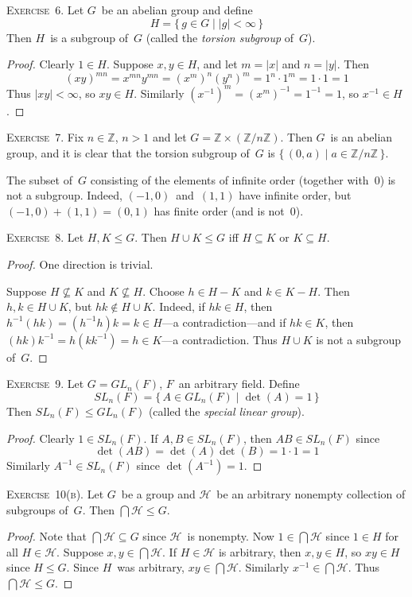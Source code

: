 \documentclass[letterpaper]{article}
\newcommand{\exercise}[1]{\goodbreak\noindent\textsc{Exercise~{#1}.}}
\newcommand{\Z}{\mathbb{Z}}
\renewcommand{\H}{\mathcal{H}}
\newcommand{\union}{\cup}
\newcommand{\bigsect}{\bigcap}
\newcommand{\subgroup}{\le}
\newcommand{\ord}[1]{|{#1}|}
\begin{document}
\exercise{6} Let $G$~be an abelian group and define
$$H=\{\,g\in G\mid\ord{g}<\infty\,\}$$
Then $H$~is a subgroup of~$G$ (called the \emph{torsion subgroup} of~$G$).
\begin{proof}
Clearly $1\in H$. Suppose $x,y\in H$, and let $m=\ord{x}$ and $n=\ord{y}$. Then
$$(xy)^{mn}=x^{mn}y^{mn}=(x^m)^n(y^n)^m=1^n\cdot1^m=1\cdot1=1$$
Thus $\ord{xy}<\infty$, so $xy\in H$. Similarly $(x^{-1})^m=(x^m)^{-1}=1^{-1}=1$, so $x^{-1}\in H$.
\end{proof}

\exercise{7} Fix $n\in\Z$, $n>1$ and let $G=\Z\times(\Z/n\Z)$. Then $G$~is an abelian group, and it is clear that the torsion subgroup of~$G$ is $\{\,(0,a)\mid a\in\Z/n\Z\,\}$.

The subset of~$G$ consisting of the elements of infinite order (together with~$0$) is not a subgroup. Indeed, $(-1,0)$~and~$(1,1)$ have infinite order, but $(-1,0)+(1,1)=(0,1)$ has finite order (and is not~$0$).

\bigskip
\exercise{8}
Let $H,K\subgroup G$. Then $H\union K\subgroup G$ iff $H\subseteq K$ or $K\subseteq H$.
\begin{proof}
One direction is trivial.

Suppose $H\not\subseteq K$ and $K\not\subseteq H$. Choose $h\in H-K$ and $k\in K-H$. Then $h,k\in H\union K$, but $hk\not\in H\union K$. Indeed, if $hk\in H$, then $h^{-1}(hk)=(h^{-1}h)k=k\in H$---a contradiction---and if $hk\in K$, then $(hk)k^{-1}=h(kk^{-1})=h\in K$---a contradiction. Thus $H\union K$ is not a subgroup of~$G$.
\end{proof}

\exercise{9}
Let $G=GL_n(F)$, $F$~an arbitrary field. Define
$$SL_n(F)=\{\,A\in GL_n(F)\mid \det(A)=1\,\}$$
Then $SL_n(F)\subgroup GL_n(F)$ (called the \emph{special linear group}).
\begin{proof}
Clearly $1\in SL_n(F)$. If $A,B\in SL_n(F)$, then $AB\in SL_n(F)$ since
$$\det(AB)=\det(A)\det(B)=1\cdot1=1$$
Similarly $A^{-1}\in SL_n(F)$ since $\det(A^{-1})=1$.
\end{proof}

\exercise{10(b)}
Let $G$~be a group and $\H$~be an arbitrary nonempty collection of subgroups of~$G$. Then $\bigsect\H\subgroup G$.
\begin{proof}
Note that $\bigsect\H\subseteq G$ since $\H$~is nonempty. Now $1\in\bigsect\H$ since $1\in H$ for all $H\in\H$. Suppose $x,y\in\bigsect\H$. If $H\in\H$ is arbitrary, then $x,y\in H$, so $xy\in H$ since $H\subgroup G$. Since $H$~was arbitrary, $xy\in\bigsect\H$. Similarly $x^{-1}\in\bigsect\H$. Thus $\bigsect\H\subgroup G$.
\end{proof}
\end{document}
